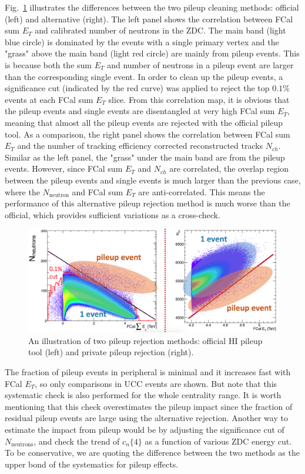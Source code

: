 Fig.~\ref{fig:sys_pu_eg} illustrates the differences between the two pileup cleaning methods: official (left) and alternative (right). The left panel shows the correlation between FCal sum $E_T$ and calibrated number of neutrons in the ZDC. The main band (light blue circle) is dominated by the events with a single primary vertex and the "grass" above the main band (light red circle) are mainly from pileup events. This is because both the sum $E_T$ and number of neutrons in a pileup event are larger than the corresponding single event. In order to clean up the pileup events, a significance cut (indicated by the red curve) was applied to reject the top $0.1\%$ events at each FCal sum $E_T$ slice. From this correlation map, it is obvious that the pileup events and single events are disentangled at very high FCal sum $E_T$, meaning that almost all the pileup events are rejected with the official pileup tool. As a comparison, the right panel shows the correlation between FCal sum $E_T$ and the number of tracking efficiency corrected reconstructed tracks $N_{ch}$. Similar as the left panel, the "grass" under the main band are from the pileup events. However, since FCal sum $E_T$ and $N_{ch}$ are correlated, the overlap region between the pileup events and single events is much larger than the previous case, where the $N_\text{neutron}$ and FCal sum $E_T$ are anti-correlated. This means the performance of this alternative pileup rejection method is much worse than the official, which provides sufficient variations as a cross-check.
\begin{figure}[H]
\centering
\includegraphics[width=.9\linewidth]{figs/sec_sys/pu_eg.png}
\caption{An illustration of two pileup rejection methods: official HI pileup tool (left) and private pileup rejection (right).}
\label{fig:sys_pu_eg}
\end{figure}

The fraction of pileup events in peripheral is minimal and it increases fast with FCal $E_{T}$, so only comparisons in UCC events are shown. But note that this systematic check is also performed for the whole centrality range. It is worth mentioning that this check overestimates the pileup impact since the fraction of residual pileup events are large using the alternative rejection. Another way to estimate the impact from pileup would be by adjusting the significance cut of $N_\text{neutrons}$, and check the trend of $c_n\{4\}$ as a function of various ZDC energy cut. To be conservative, we are quoting the difference between the two methods as the upper bond of the systematics for pileup effects.

